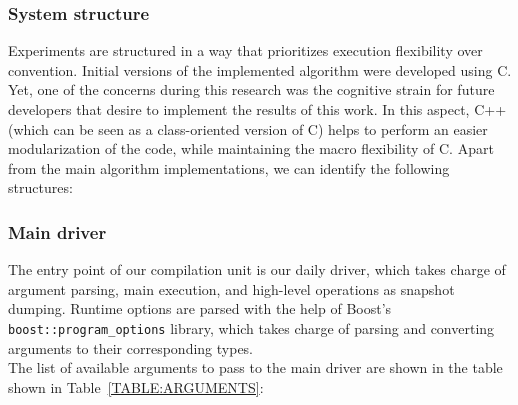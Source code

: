 \subsubsection{System structure}
Experiments are structured in a way that prioritizes execution flexibility over convention. Initial versions of the implemented algorithm were developed using C. Yet, one of the concerns during this research was the cognitive strain for future developers that desire to implement the results of this work. In this aspect, C++ (which can be seen as a class-oriented version of C) helps to perform an easier modularization of the code, while maintaining the macro flexibility of C. Apart from the main algorithm implementations, we can identify the following structures:\\

\subsubsection{Main driver}
The entry point of our compilation unit is our daily driver, which takes charge of argument parsing, main execution, and high-level operations as snapshot dumping.  Runtime options are parsed with the help of Boost's \texttt{boost::program\_options} library, which takes charge of parsing and converting arguments to their corresponding types. \\

The list of available arguments to pass to the main driver are shown in the table shown in Table~\ref{TABLE:ARGUMENTS}:\\


